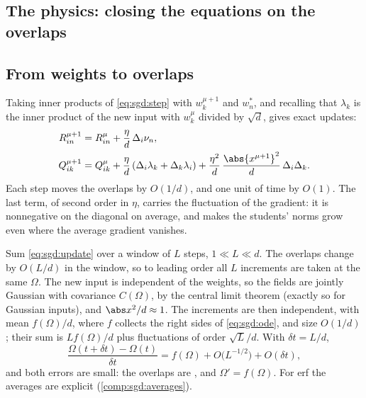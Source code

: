 \begin{refsection}
\section{The physics: closing the equations on the overlaps}\label{sec:sgd:physics}

\subsection{From weights to overlaps}

Taking inner products of \eqref{eq:sgd:step} with $w_k^{\mu+1}$ and $w^*_n$, and recalling that $\lambda_k$ is the inner product of the new input with $w_k^\mu$ divided by $\sqrt d$, gives exact updates:
\begin{equation}\label{eq:sgd:update}
\begin{aligned}
R^{\mu+1}_{in}&=R^\mu_{in}+\frac\eta d\,\Delta_i\nu_n,\\
Q^{\mu+1}_{ik}&=Q^\mu_{ik}+\frac\eta d\,(\Delta_i\lambda_k+\Delta_k\lambda_i)+\frac{\eta^2}d\,\frac{\abs{x^{\mu+1}}^2}d\,\Delta_i\Delta_k.
\end{aligned}
\end{equation}
Each step moves the overlaps by $O(1/d)$, and one unit of time by $O(1)$. The last term, of second order in $\eta$, carries the fluctuation of the gradient: it is nonnegative on the diagonal on average, and makes the students' norms grow even where the average gradient vanishes.

\begin{heuristic}
Sum \eqref{eq:sgd:update} over a window of $L$ steps, $1\ll L\ll d$. The overlaps change by $O(L/d)$ in the window, so to leading order all $L$ increments are taken at the same $\Omega$. The new input is independent of the weights, so the fields are jointly Gaussian with covariance $C(\Omega)$, by the central limit theorem (exactly so for Gaussian inputs), and $\abs x^2/d\approx1$. The increments are then independent, with mean $f(\Omega)/d$, where $f$ collects the right sides of \eqref{eq:sgd:ode}, and size $O(1/d)$; their sum is $Lf(\Omega)/d$ plus fluctuations of order $\sqrt L/d$. With $\delta t=L/d$,
\[
\frac{\Omega(t+\delta t)-\Omega(t)}{\delta t}=f(\Omega)+O\bigl(L^{-1/2}\bigr)+O(\delta t),
\]
and both errors are small: the overlaps are , and $\Omega'=f(\Omega)$. For erf the averages are explicit (\cref{comp:sgd:averages}).
\end{heuristic}


\end{refsection}
